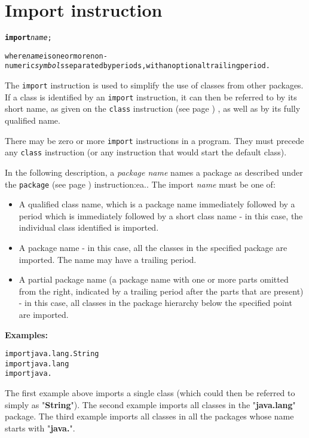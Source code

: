 \chapter{Import instruction}\label{"id"}
\begin{shaded}
\begin{alltt}
\textbf{import} \emph{name};

where \emph{name} is one or more non-numeric \emph{symbol}s separated by periods, with an optional trailing period.
\end{alltt}
\end{shaded}
 
The \texttt{import} instruction is used to simplify the use of
classes from other packages.
If a class is identified by an \texttt{import} instruction, it can then
be referred to by its short name, as given on the
 \texttt{class} instruction (see page \pageref{refclass}) , as well as by its fully
qualified name.
 
There may be zero or more \texttt{import} instructions in a program.
They must precede any \texttt{class} instruction (or any instruction
that would start the default class).
 
In the following description, a \emph{package name} names a package
as described under the  \texttt{package} (see page \pageref{refpackage}) 
instruction:ea..
The import \emph{name} must be one of:
\begin{itemize}
\item A qualified class name, which is a package name immediately followed
by a period which is immediately followed by a short class name -
in this case, the individual class identified is imported.
\item A package name - in this case, all the classes in the specified
package are imported.  The name may have a trailing period.
\item A partial package name (a package name with one or more parts
omitted from the right, indicated by a trailing period after the parts
that are present) - in this case, all classes in the package hierarchy
below the specified point are imported.
\end{itemize}
 \textbf{Examples:}
\begin{alltt}
import java.lang.String
import java.lang
import java.
\end{alltt}
The first example above imports a single class (which could then be
referred to simply as "\textbf{String}").
The second example imports all classes in the
"\textbf{java.lang}" package.
The third example imports all classes in all the packages whose name
starts with "\textbf{java.}".
 
